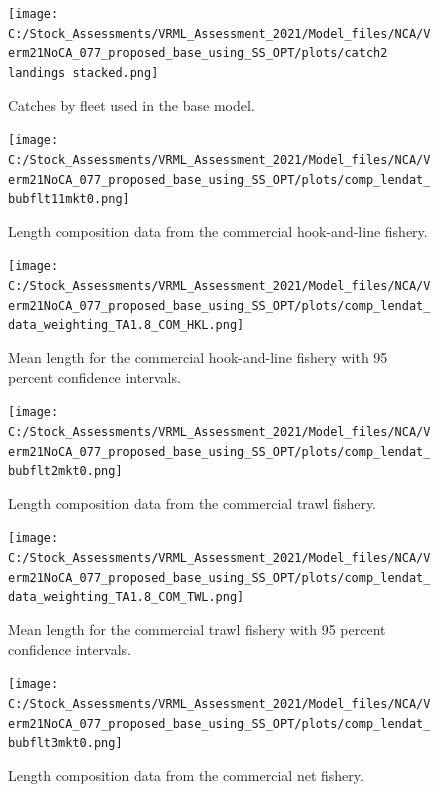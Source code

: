 \documentclass[11pt,
  english,
  a4paper,
]{article}
\begin{document}
\begin{figure}
\centering
\texttt{[image: C:/Stock\_Assessments/VRML\_Assessment\_2021/Model\_files/NCA/Verm21NoCA\_077\_proposed\_base\_using\_SS\_OPT/plots/catch2 landings stacked.png]}
\caption{Catches by fleet used in the base model.\label{fig:catch}}
\end{figure}

\begin{figure}
\centering
\texttt{[image: C:/Stock\_Assessments/VRML\_Assessment\_2021/Model\_files/NCA/Verm21NoCA\_077\_proposed\_base\_using\_SS\_OPT/plots/comp\_lendat\_bubflt11mkt0.png]}
\caption{Length composition data from the commercial hook-and-line fishery.\label{fig:len-data-COM-HKL}}
\end{figure}

\begin{figure}
\centering
\texttt{[image: C:/Stock\_Assessments/VRML\_Assessment\_2021/Model\_files/NCA/Verm21NoCA\_077\_proposed\_base\_using\_SS\_OPT/plots/comp\_lendat\_data\_weighting\_TA1.8\_COM\_HKL.png]}
\caption{Mean length for the commercial hook-and-line fishery with 95 percent confidence intervals.\label{fig:mean-com-len-data-COM-HKL}}
\end{figure}

\begin{figure}
\centering
\texttt{[image: C:/Stock\_Assessments/VRML\_Assessment\_2021/Model\_files/NCA/Verm21NoCA\_077\_proposed\_base\_using\_SS\_OPT/plots/comp\_lendat\_bubflt2mkt0.png]}
\caption{Length composition data from the commercial trawl fishery.\label{fig:len-data-COM-TWL}}
\end{figure}

\begin{figure}
\centering
\texttt{[image: C:/Stock\_Assessments/VRML\_Assessment\_2021/Model\_files/NCA/Verm21NoCA\_077\_proposed\_base\_using\_SS\_OPT/plots/comp\_lendat\_data\_weighting\_TA1.8\_COM\_TWL.png]}
\caption{Mean length for the commercial trawl fishery with 95 percent confidence intervals.\label{fig:mean-com-len-data-COM-TWL}}
\end{figure}

\begin{figure}
\centering
\texttt{[image: C:/Stock\_Assessments/VRML\_Assessment\_2021/Model\_files/NCA/Verm21NoCA\_077\_proposed\_base\_using\_SS\_OPT/plots/comp\_lendat\_bubflt3mkt0.png]}
\caption{Length composition data from the commercial net fishery.\label{fig:len-data-COM-NET}}
\end{figure}
\end{document}
